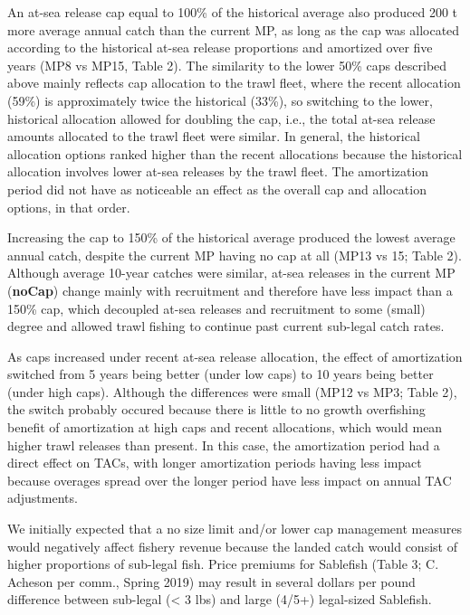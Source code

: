 \documentclass[11pt]{book}
\begin{document}
An at-sea release cap equal to 100\% of the historical average also produced 200 t more average annual catch than the current MP, as long as the cap was allocated according to the historical at-sea release proportions and amortized over five years (MP8 vs MP15, Table 2). The similarity to the lower 50\% caps described above mainly reflects cap allocation to the trawl fleet, where the recent allocation (59\%) is approximately twice the historical (33\%), so switching to the lower, historical allocation allowed for doubling the cap, i.e., the total at-sea release amounts allocated to the trawl fleet were similar. In general, the historical allocation options ranked higher than the recent allocations because the historical allocation involves lower at-sea releases by the trawl fleet. The amortization period did not have as noticeable an effect as the overall cap and allocation options, in that order.

Increasing the cap to 150\% of the historical average produced the lowest average annual catch, despite the current MP having no cap at all (MP13 vs 15; Table 2). Although average 10-year catches were similar, at-sea releases in the current MP (\textbf{noCap}) change mainly with recruitment and therefore have less impact than a 150\% cap, which decoupled at-sea releases and recruitment to some (small) degree and allowed trawl fishing to continue past current sub-legal catch rates.

As caps increased under recent at-sea release allocation, the effect of amortization switched from 5 years being better (under low caps) to 10 years being better (under high caps). Although the differences were small (MP12 vs MP3; Table 2), the switch probably occured because there is little to no growth overfishing benefit of amortization at high caps and recent allocations, which would mean higher trawl releases than present. In this case, the amortization period had a direct effect on TACs, with longer amortization periods having less impact because overages spread over the longer period have less impact on annual TAC adjustments.

We initially expected that a no size limit and/or lower cap management measures would negatively affect fishery revenue because the landed catch would consist of higher proportions of sub-legal fish. Price premiums for Sablefish (Table 3; C. Acheson per comm., Spring 2019) may result in several dollars per pound difference between sub-legal (\textless{} 3 lbs) and large (4/5+) legal-sized Sablefish.
\end{document}

